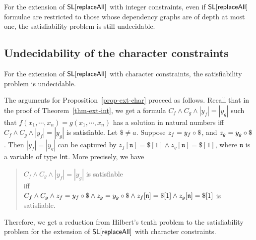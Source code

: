 \begin{theorem}\label{thm-ext-int-strong}
	For the extension of $\mathsf{SL}[\mathsf{replaceAll}]$ with integer constraints, even if $\mathsf{SL}[\mathsf{replaceAll}]$ formulae are restricted to those whose dependency graphs are of depth at most one, the satisfiability problem is still undecidable.
\end{theorem}

%	
%	

\subsection{Undecidability of the character constraints}

\begin{proposition}\label{prop-ext-char}
	For the extension of $\mathsf{SL}[\mathsf{replaceAll}]$ with character constraints, the satisfiability problem is undecidable. 
\end{proposition}

The arguments for Proposition~\ref{prop-ext-char} proceed as follows. Recall that in the proof of Theorem~\ref{thm-ext-int}, we get a formula $C_f \wedge C_g \wedge |y_f| = |y_g|$ such that $f(x_1,\cdots, x_n) = g(x_1,\cdots, x_n)$ has a solution in natural numbers iff $C_f \wedge C_g \wedge |y_f| = |y_g|$ is satisfiable. Let $\$ \neq a$. Suppose  $z_f = y_f \concat \$$, and $z_g = y_g \concat \$$. Then $|y_f| = |y_g|$ can be captured by $z_f[\mathfrak{n}] = \$[1] \wedge  z_g[\mathfrak{n}] = \$[1]$, where $\mathfrak{n}$ is a variable of type ${\sf Int}$. More precisely, 
%
we have 
\begin{quote}
\centering
$C_f \wedge C_g \wedge |y_f|= |y_g|$ is satisfiable \\
%
iff \\
%
$C_f \wedge C_g \wedge z_f = y_f \circ \$ \wedge z_g = y_g \circ \$ \wedge z_f[\mathfrak{n}] = \$[1] \wedge  z_g[\mathfrak{n}] = \$[1]$ is satisfiable. 
\end{quote}
Therefore, we get a reduction from Hilbert's tenth problem to the satisfiability problem for the extension of $\mathsf{SL}[\mathsf{replaceAll}]$ with character constraints. 

